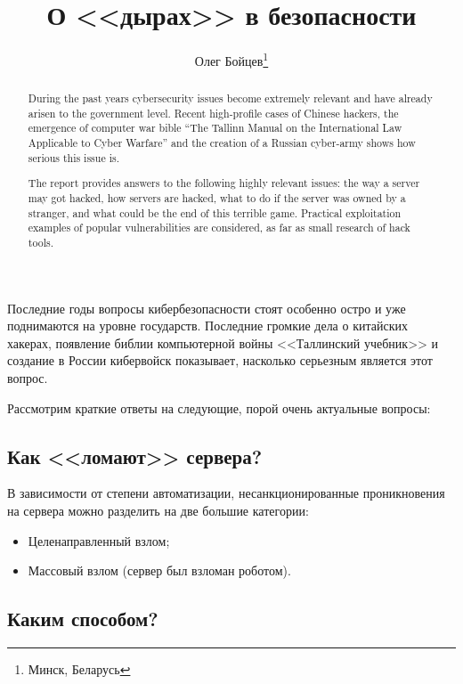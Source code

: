 \documentclass[10pt, a5paper]{article}
\begin{document}
\title{О <<дырах>> в безопасности}%

\author{Олег Бойцев\footnote{Минск, Беларусь}}
\maketitle

\begin{abstract}
During the past years cybersecurity issues become extremely relevant and have already arisen to the government level. Recent high-profile cases of Chinese hackers, the emergence of computer war bible ``The Tallinn Manual on the International Law Applicable to Cyber Warfare'' and the creation of a Russian cyber-army shows how serious this issue is.

The report provides answers to the following highly relevant issues: the way a server may got hacked, how servers are hacked, what to do if the server was owned by a stranger, and what could be the end of this terrible game. Practical exploitation examples of popular vulnerabilities are considered, as far as small research of hack tools.
\end{abstract}

Последние годы вопросы кибербезопасности стоят особенно остро и уже поднимаются на уровне государств. Последние громкие дела о китайских хакерах, появление библии компьютерной войны <<Таллинский учебник>> и создание в России кибервойск показывает, насколько серьезным является этот вопрос.

Рассмотрим краткие ответы на следующие, порой очень актуальные вопросы:

\subsection*{Как <<ломают>> сервера?}

В зависимости от степени автоматизации, несанкционированные проникновения на сервера можно разделить на две большие категории:

\begin{itemize}
  \item Целенаправленный взлом;
  \item Массовый взлом (сервер был взломан роботом).
\end{itemize}

\subsection*{Каким способом?}
\end{document}

